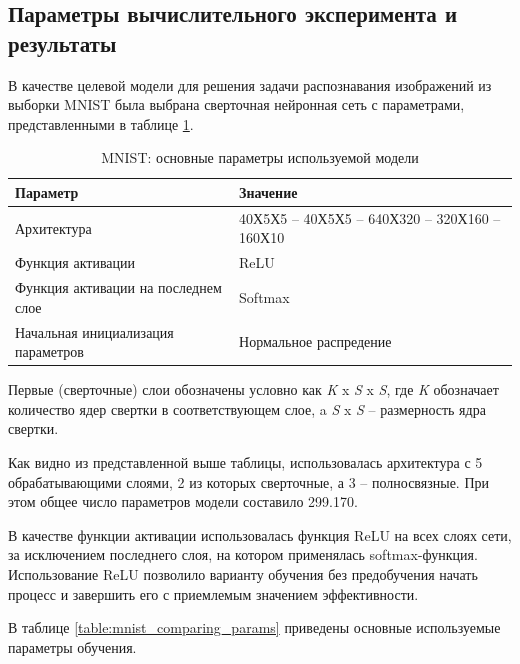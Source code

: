 \subsection{Параметры вычислительного эксперимента и результаты}

В качестве целевой модели для решения задачи распознавания изображений из выборки MNIST была выбрана сверточная нейронная сеть с параметрами, представленными в таблице \ref{table:mnist_conv_model}.

\begin{table} [!h]
  \caption{MNIST: основные параметры используемой модели}\label{table:mnist_conv_model}
\centering
\begin{tabular}{| p{7cm} | p{8cm} |}
  \hline
    \textbf{Параметр} & \textbf{Значение}\\
    \hline
    Архитектура & 40Х5Х5 -- 40Х5Х5 -- 640Х320 -- 320Х160 -- 160Х10\\
    \hline
    Функция активации & ReLU \\
    \hline
    Функция активации на последнем слое & Softmax \\
    Начальная инициализация параметров & Нормальное распредение \\
    \hline
\end{tabular}
\end{table}

Первые (сверточные) слои обозначены условно как \textit{K} x \textit{S} x \textit{S}, где \textit{K} обозначает количество ядер свертки в соответствующем слое, a \textit{S} x \textit{S} -- размерность ядра свертки.

Как видно из представленной выше таблицы, использовалась архитектура с 5 обрабатывающими слоями, 2 из которых сверточные, а 3 -- полносвязные. При этом общее число параметров модели составило 299.170.

В качестве функции активации использовалась функция ReLU на всех слоях сети, за исключением последнего слоя, на котором применялась softmax-функция. Использование ReLU позволило варианту обучения без предобучения начать процесс и завершить его с приемлемым значением эффективности.

В таблице \ref{table:mnist_comparing_params} приведены основные используемые параметры обучения. 

